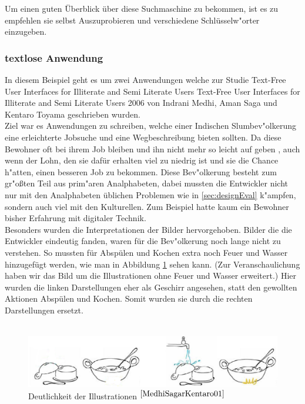 Um einen guten Überblick über diese Suchmaschine zu bekommen, ist es zu empfehlen sie selbst Auszuprobieren und verschiedene Schlüsselw"orter einzugeben.

\newpage
\subsubsection{textlose Anwendung}
In diesem Beispiel geht es um zwei Anwendungen welche zur Studie \glqq Text-Free User Interfaces for Illiterate and Semi Literate Users \grqq
{}
					{Text-Free User Interfaces for Illiterate and Semi Literate Users}
					{2006}
					{}
 von Indrani Medhi, Aman Saga und Kentaro Toyama geschrieben wurden.\\
Ziel war es Anwendungen zu schreiben, welche einer Indischen Slumbev"olkerung eine erleichterte Jobsuche und eine Wegbeschreibung bieten sollten. Da diese Bewohner oft bei ihrem Job bleiben und ihn nicht mehr so leicht auf geben , auch wenn der Lohn, den sie dafür erhalten viel zu niedrig ist und sie die Chance h"atten, einen besseren Job zu bekommen. Diese Bev"olkerung besteht zum gr"oßten Teil aus prim"aren Analphabeten, dabei mussten die Entwickler nicht nur mit den Analphabeten üblichen Problemen wie in \ref{sec:designEval} k"ampfen, sondern auch viel mit den Kulturellen. Zum Beispiel hatte kaum ein Bewohner bisher Erfahrung mit digitaler Technik.\\
Besonders wurden die Interpretationen der Bilder hervorgehoben. Bilder die die Entwickler eindeutig fanden, waren für die Bev"olkerung noch lange nicht zu verstehen. So mussten für Abspülen und Kochen extra noch Feuer und Wasser hinzugefügt werden, wie man in Abbildung \ref{fig:picfail} sehen kann. (Zur Veranschaulichung haben wir das Bild um die Illustrationen ohne Feuer und Wasser erweitert.) Hier wurden die linken Darstellungen eher als Geschirr angesehen, statt den gewollten Aktionen Abspülen und Kochen. Somit wurden sie durch die rechten Darstellungen ersetzt.\\\\

\begin{figure}[h]
	\centering
		\includegraphics[width=1.00\textwidth]{Daten/pic_fail2.PNG}
	\caption{Deutlichkeit der Illustrationen $^{\ref{MedhiSagarKentaro01}}$}
	\label{fig:picfail}
\end{figure}

